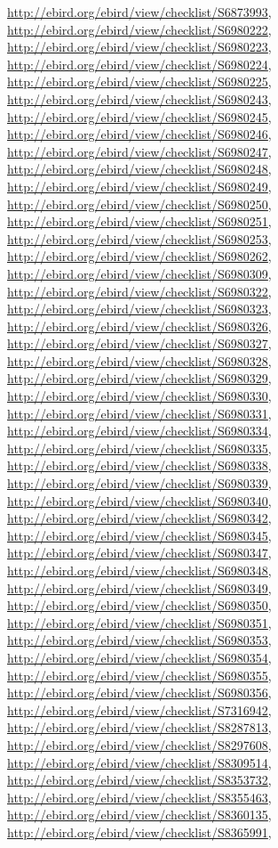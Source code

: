 \documentclass[9pt, article]{memoir}
\begin{document}
\begin{multicols}{2}
\url{http://ebird.org/ebird/view/checklist/S6873993}, 
\url{http://ebird.org/ebird/view/checklist/S6980222}, 
\url{http://ebird.org/ebird/view/checklist/S6980223}, 
\url{http://ebird.org/ebird/view/checklist/S6980224}, 
\url{http://ebird.org/ebird/view/checklist/S6980225}, 
\url{http://ebird.org/ebird/view/checklist/S6980243}, 
\url{http://ebird.org/ebird/view/checklist/S6980245}, 
\url{http://ebird.org/ebird/view/checklist/S6980246}, 
\url{http://ebird.org/ebird/view/checklist/S6980247}, 
\url{http://ebird.org/ebird/view/checklist/S6980248}, 
\url{http://ebird.org/ebird/view/checklist/S6980249}, 
\url{http://ebird.org/ebird/view/checklist/S6980250}, 
\url{http://ebird.org/ebird/view/checklist/S6980251}, 
\url{http://ebird.org/ebird/view/checklist/S6980253}, 
\url{http://ebird.org/ebird/view/checklist/S6980262}, 
\url{http://ebird.org/ebird/view/checklist/S6980309}, 
\url{http://ebird.org/ebird/view/checklist/S6980322}, 
\url{http://ebird.org/ebird/view/checklist/S6980323}, 
\url{http://ebird.org/ebird/view/checklist/S6980326}, 
\url{http://ebird.org/ebird/view/checklist/S6980327}, 
\url{http://ebird.org/ebird/view/checklist/S6980328}, 
\url{http://ebird.org/ebird/view/checklist/S6980329}, 
\url{http://ebird.org/ebird/view/checklist/S6980330}, 
\url{http://ebird.org/ebird/view/checklist/S6980331}, 
\url{http://ebird.org/ebird/view/checklist/S6980334}, 
\url{http://ebird.org/ebird/view/checklist/S6980335}, 
\url{http://ebird.org/ebird/view/checklist/S6980338}, 
\url{http://ebird.org/ebird/view/checklist/S6980339}, 
\url{http://ebird.org/ebird/view/checklist/S6980340}, 
\url{http://ebird.org/ebird/view/checklist/S6980342}, 
\url{http://ebird.org/ebird/view/checklist/S6980345}, 
\url{http://ebird.org/ebird/view/checklist/S6980347}, 
\url{http://ebird.org/ebird/view/checklist/S6980348}, 
\url{http://ebird.org/ebird/view/checklist/S6980349}, 
\url{http://ebird.org/ebird/view/checklist/S6980350}, 
\url{http://ebird.org/ebird/view/checklist/S6980351}, 
\url{http://ebird.org/ebird/view/checklist/S6980353}, 
\url{http://ebird.org/ebird/view/checklist/S6980354}, 
\url{http://ebird.org/ebird/view/checklist/S6980355}, 
\url{http://ebird.org/ebird/view/checklist/S6980356}, 
\url{http://ebird.org/ebird/view/checklist/S7316942}, 
\url{http://ebird.org/ebird/view/checklist/S8287813}, 
\url{http://ebird.org/ebird/view/checklist/S8297608}, 
\url{http://ebird.org/ebird/view/checklist/S8309514}, 
\url{http://ebird.org/ebird/view/checklist/S8353732}, 
\url{http://ebird.org/ebird/view/checklist/S8355463}, 
\url{http://ebird.org/ebird/view/checklist/S8360135}, 
\url{http://ebird.org/ebird/view/checklist/S8365991}, 

\end{multicols}
\end{document}
